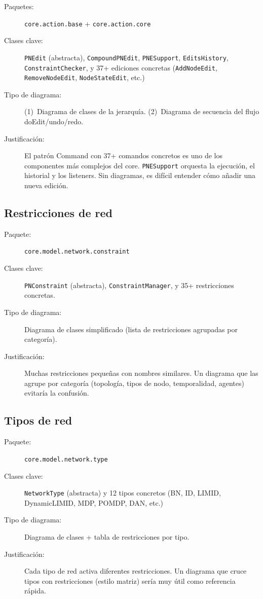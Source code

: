 \documentclass[11pt,a4paper]{article}
\newcommand{\code}[1]{\texttt{#1}}
\newcommand{\pkg}[1]{\texttt{\small #1}}
\begin{document}
\begin{description}
  \item[Paquetes:] \pkg{core.action.base} + \pkg{core.action.core}
  \item[Clases clave:] \code{PNEdit} (abstracta),
        \code{CompoundPNEdit}, \code{PNESupport},
        \code{EditsHistory}, \code{ConstraintChecker},
        y 37+ ediciones concretas (\code{AddNodeEdit},
        \code{RemoveNodeEdit}, \code{NodeStateEdit}, etc.)
  \item[Tipo de diagrama:] (1)~Diagrama de clases de la jerarqu\'ia.
        (2)~Diagrama de secuencia del flujo doEdit/undo/redo.
  \item[Justificaci\'on:] El patr\'on Command con 37+ comandos
        concretos es uno de los componentes m\'as complejos del core.
        \code{PNESupport} orquesta la ejecuci\'on, el historial y los
        listeners.  Sin diagramas, es dif\'icil entender c\'omo a\~nadir
        una nueva edici\'on.
\end{description}

\subsection{Restricciones de red}

\begin{description}
  \item[Paquete:] \pkg{core.model.network.constraint}
  \item[Clases clave:] \code{PNConstraint} (abstracta),
        \code{ConstraintManager}, y 35+ restricciones concretas.
  \item[Tipo de diagrama:] Diagrama de clases simplificado (lista de
        restricciones agrupadas por categor\'ia).
  \item[Justificaci\'on:] Muchas restricciones peque\~nas con nombres
        similares.  Un diagrama que las agrupe por categor\'ia
        (topolog\'ia, tipos de nodo, temporalidad, agentes) evitar\'ia
        la confusi\'on.
\end{description}

\subsection{Tipos de red}

\begin{description}
  \item[Paquete:] \pkg{core.model.network.type}
  \item[Clases clave:] \code{NetworkType} (abstracta) y 12 tipos
        concretos (BN, ID, LIMID, DynamicLIMID, MDP, POMDP, DAN, etc.)
  \item[Tipo de diagrama:] Diagrama de clases + tabla de restricciones
        por tipo.
  \item[Justificaci\'on:] Cada tipo de red activa diferentes
        restricciones.  Un diagrama que cruce tipos con restricciones
        (estilo matriz) ser\'ia muy \'util como referencia r\'apida.
\end{description}
\end{document}
